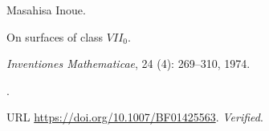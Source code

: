 Masahisa Inoue.

\newblock On surfaces of class {$VII_0$}.

\newblock \emph{Inventiones Mathematicae}, 24 (4): 269--310,
  1974.

\newblock {}.

\newblock URL \url{https://doi.org/10.1007/BF01425563}.
\newblock \emph{Verified}.

